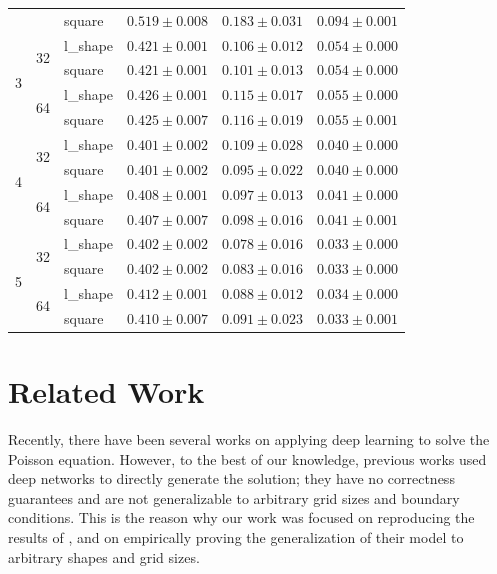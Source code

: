 \documentclass{rescience} %
\begin{document}
\begin{table}[h]
{\begin{tabular}{lllccc}
  &    & square &  $0.519\pm0.008$ &  $0.183\pm0.031$ &  $0.094\pm0.001$ \\
\cmidrule(lr){1-6}
\multirow{4}{*}{3} & \multirow{2}{*}{32} & l\_shape &  $0.421\pm0.001$ &  $0.106\pm0.012$ &  $0.054\pm0.000$ \\
  &    & square &  $0.421\pm0.001$ &  $0.101\pm0.013$ &  $0.054\pm0.000$ \\
\cmidrule(lr){2-6}
  & \multirow{2}{*}{64} & l\_shape &  $0.426\pm0.001$ &  $0.115\pm0.017$ &  $0.055\pm0.000$ \\
  &    & square &  $0.425\pm0.007$ &  $0.116\pm0.019$ &  $0.055\pm0.001$ \\
\cmidrule(lr){1-6}
\multirow{4}{*}{4} & \multirow{2}{*}{32} & l\_shape &  $0.401\pm0.002$ &  $0.109\pm0.028$ &  $0.040\pm0.000$ \\
  &    & square &  $0.401\pm0.002$ &  $0.095\pm0.022$ &  $0.040\pm0.000$ \\
\cmidrule(lr){2-6}
  & \multirow{2}{*}{64} & l\_shape &  $0.408\pm0.001$ &  $0.097\pm0.013$ &  $0.041\pm0.000$ \\
  &    & square &  $0.407\pm0.007$ &  $0.098\pm0.016$ &  $0.041\pm0.001$ \\
\cmidrule(lr){1-6}
\multirow{4}{*}{5} & \multirow{2}{*}{32} & l\_shape &  $0.402\pm0.002$ &  $0.078\pm0.016$ &  $0.033\pm0.000$ \\
  &    & square &  $0.402\pm0.002$ &  $0.083\pm0.016$ &  $0.033\pm0.000$ \\
\cmidrule(lr){2-6}
  & \multirow{2}{*}{64} & l\_shape &  $0.412\pm0.001$ &  $0.088\pm0.012$ &  $0.034\pm0.000$ \\
  &    & square &  $0.410\pm0.007$ &  $0.091\pm0.023$ &  $0.033\pm0.001$ \\
\bottomrule
\end{tabular}}
    \label{tab:best_model_results}
\end{table}

\FloatBarrier
\section{Related Work}
Recently, there have been several works on applying deep learning to solve the Poisson equation. However, to the best of our knowledge, previous works used deep networks to directly generate the solution; they have no correctness guarantees and are not generalizable to arbitrary grid sizes and
boundary conditions. This is the reason why our work was focused on reproducing the results of \cite{original_paper}, and on empirically proving the generalization of their model to arbitrary shapes and grid sizes.
\end{document}
